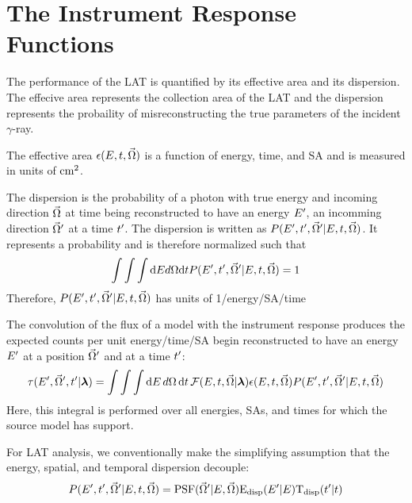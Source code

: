 \section{The  Instrument Response Functions}


The performance of the LAT is quantified by its effective area
and its dispersion. The effecive area represents the collection area of the
\ac{LAT} and the dispersion represents the probaility of misreconstructing
the true parameters of the incident $\gamma$-ray.

The
effective area $\epsilon(E,t,\vec\Omega)$
is a function of energy, time, and \ac{SA} and is measured in units of 
$\text{cm}^2$. 

The dispersion is the probability of a photon with true energy
\energy and incoming direction $\vec\Omega$ at time \time being
reconstructed to have an energy $E'$, an incomming direction
$\vec\Omega'$ at a time $t'$.  The dispersion is written as
$P(E',t',\vec\Omega'|E,t,\vec\Omega)$.
It represents a probability and is therefore normalized such that
\begin{equation}
  \int \int \int \text{d}E d\Omega \text{d}t 
  P(E',t',\vec\Omega'|E,t,\vec\Omega) = 1
\end{equation}
Therefore,
$P(E',t',\vec\Omega'|E,t,\vec\Omega)$
has units of 1/energy/\acl{SA}/time

The convolution of the flux of a model with the instrument response 
produces the expected counts per unit energy/time/\acl{SA}
begin reconstructed to have 
an energy $E'$ 
at a position $\vec\Omega'$ and at a time $t'$:
\begin{equation}
  \eqnlabel{eventrate}
  \eventrate(\energy',\solidangle',\time'|\modelparams)
  = \int \int \int \denergy \, \dsolidangle \, \dtime \,
  \fluxdensity(\energy,\time,\vec\Omega|\modelparams) 
  \effectivearea(\energy,\time,\solidangle) \dispersion(\energy',\time',\solidangle'|\energy,\time,\solidangle)
\end{equation}
Here, this integral is performed over all energies, \acp{SA}, and times
for which the source model has support.




For LAT analysis, we conventionally make the simplifying assumption that
the energy, spatial, and temporal dispersion decouple:
\begin{equation}
  P(E',t',\vec\Omega'|E,t,\vec\Omega) = 
  \text{PSF}(\vec\Omega'|E,\vec\Omega) \text{E}_\text{disp}(E'|E) \text{T}_\text{disp}(t'|t)
\end{equation}

